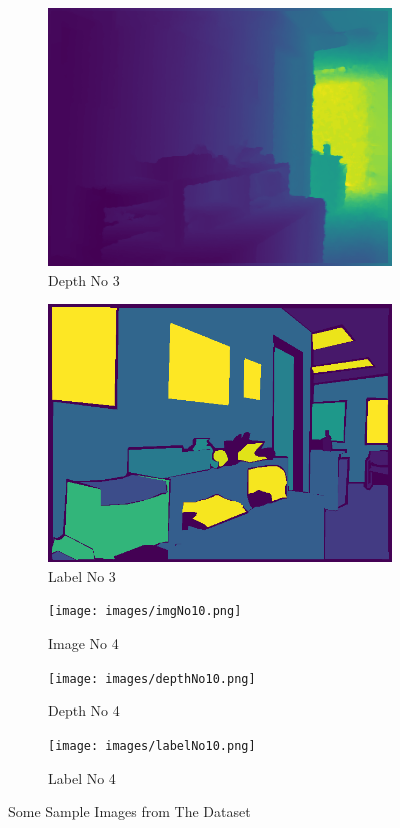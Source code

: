 \documentclass[a4paper, openany]{book}
\begin{document}
\begin{figure}[ht]
\begin{subfigure}[b]{0.3\linewidth}
    \includegraphics[width=\linewidth]{images/depthNo8.png}
    \caption{Depth No 3}
  \end{subfigure}
    \begin{subfigure}[b]{0.3\linewidth}
    \includegraphics[width=\linewidth]{images/labelNo8.png}
    \caption{Label No 3}
  \end{subfigure}
   \begin{subfigure}[b]{0.3\linewidth}
    \texttt{[image: images/imgNo10.png]}
    \caption{Image No 4}
  \end{subfigure}
  \begin{subfigure}[b]{0.3\linewidth}
    \texttt{[image: images/depthNo10.png]}
    \caption{Depth No 4}
  \end{subfigure}
    \begin{subfigure}[b]{0.3\linewidth}
    \texttt{[image: images/labelNo10.png]}
    \caption{Label No 4}
  \end{subfigure}
  \caption{Some Sample Images from The Dataset}
  \label{fig:sample_datas}
\end{figure}
\end{document}
